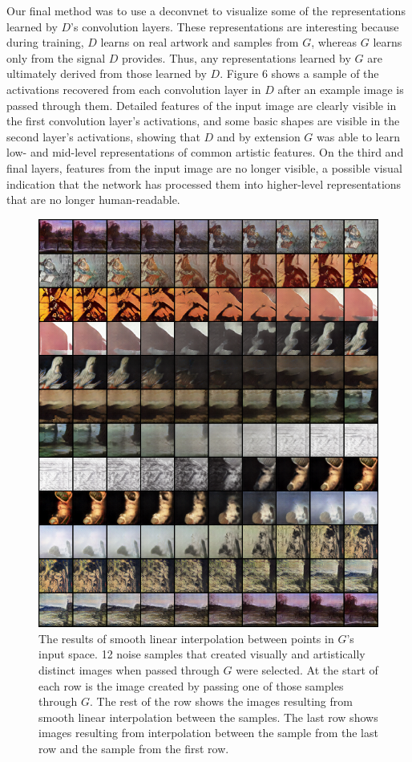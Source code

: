 \documentclass[10pt,twocolumn,letterpaper]{article}
\begin{document}
Our final method was to use a deconvnet to visualize some of the representations learned by $ D $'s convolution layers. These representations are interesting because during training, $ D $ learns on real artwork and samples from $ G $, whereas $ G $ learns only from the signal $ D $ provides. Thus, any representations learned by $ G $ are ultimately derived from those learned by $ D $. Figure 6 shows a sample of the activations recovered from each convolution layer in $ D $ after an example image is passed through them. Detailed features of the input image are clearly visible in the first convolution layer's activations, and some basic shapes are visible in the second layer's activations, showing that $ D $ and by extension $ G $ was able to learn low- and mid-level representations of common artistic features. On the third and final layers, features from the input image are no longer visible, a possible visual indication that the network has processed them into higher-level representations that are no longer human-readable. 

\begin{figure}[t]
	\begin{center}
		\includegraphics[width=0.9\linewidth]{interp.png}
	\end{center}
	\caption{The results of smooth linear interpolation between points in $ G $'s input space. 12 noise samples that created visually and artistically distinct images when passed through $ G $ were selected. At the start of each row is the image created by passing one of those samples through $ G $. The rest of the row shows the images resulting from smooth linear interpolation between the samples. The last row shows images resulting from interpolation between the sample from the last row and the sample from the first row. }
	\label{fig:long}
	\label{fig:onecol}
\end{figure}
\end{document}
